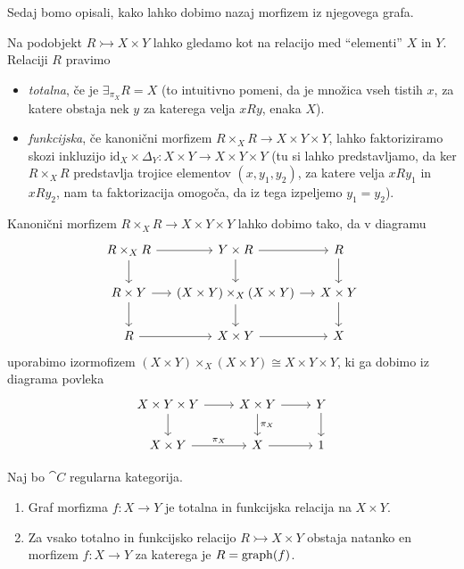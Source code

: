 \documentclass[../kategoricna_logika.tex]{subfiles}
\begin{document}
\noindent
Sedaj bomo opisali, kako lahko dobimo nazaj morfizem iz njegovega grafa.
\begin{definicija}
  Na podobjekt $R \rightarrowtail X \times Y$ lahko gledamo kot na relacijo med ``elementi'' $X$ in $Y$. Relaciji $R$ pravimo 
  \begin{itemize}
    \item \emph{totalna}, če je $\exists_{\pi_X}R = X$ (to intuitivno pomeni, da je množica vseh tistih $x$, za katere obstaja nek $y$ za katerega velja $xRy$, enaka $X$).
    \item \emph{funkcijska}, če kanonični morfizem $R \times_X R \to X \times Y \times Y$,
      lahko faktoriziramo skozi inkluzijo 
      $\mathrm{id}_X \times \Delta_Y : X \times Y \to X \times Y \times Y$
      (tu si lahko predstavljamo, da ker $R \times_X R$ predstavlja trojice elementov $(x, y_1, y_2)$,
      za katere velja $xRy_1$ in $xRy_2$, nam ta faktorizacija omogoča,
      da iz tega izpeljemo $y_1 = y_2$).
  \end{itemize}
\end{definicija}
\begin{opomba}
  Kanonični morfizem $R \times_X R \to X \times Y \times Y$ lahko dobimo tako, da v diagramu
  \begin{equation*}
  \begin{tikzcd}[row sep=normal, column sep=small]
    R \times_X R \ar[d] \ar[r] & Y \times R \ar[d] \ar[r] & R \ar[d] \\
    R \times Y \ar[d] \ar[r] & (X \times Y) \times_X (X \times Y) \ar[d] \ar[r] & X \times Y \ar[d] \\
    R \ar[r] & X \times Y \ar[r] & X
  \end{tikzcd}
  \end{equation*}
  uporabimo izormofizem $(X \times Y) \times_X (X \times Y) \cong X \times Y \times Y$, ki ga dobimo iz diagrama povleka
  \begin{equation*}
  \begin{tikzcd}[row sep=normal, column sep=normal]
    X \times Y  \times Y\ar[d] \ar[r] & X \times Y \ar[d, "\pi_X"] \ar[r] & Y \ar[d] \\
    X \times Y \ar[r, "\pi_X"] & X \ar[r] & 1
  \end{tikzcd}
  \end{equation*}
\end{opomba}
\begin{lema}
  Naj bo $\cat{C}$ regularna kategorija.
  \begin{enumerate}[label=(\roman*)]
    \item Graf morfizma $f : X \to Y$ je totalna in funkcijska relacija na $X \times Y$.
    \item Za vsako totalno in funkcijsko relacijo $R \rightarrowtail X \times Y$ obstaja natanko en morfizem $f : X \to Y$ za katerega je $R = \operatorname{graph}(f)$.
  \end{enumerate}
\end{lema}
\end{document}

